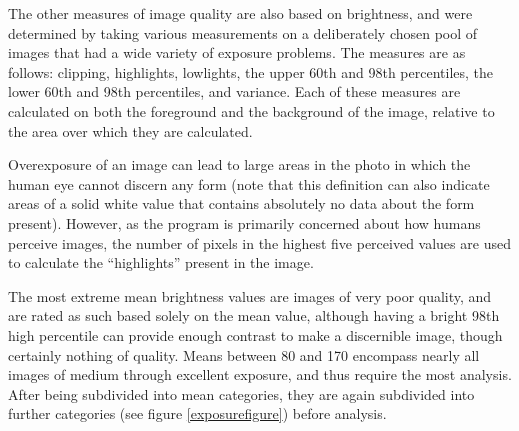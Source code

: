 \documentclass{article}
\begin{document}
The other measures of image quality are also based on brightness, and were determined by taking various measurements on a deliberately chosen pool of images that had a wide variety of exposure problems. The measures are as follows: clipping, highlights, lowlights, the upper 60th and 98th percentiles, the lower 60th and 98th percentiles, and variance. Each of these measures are calculated on both the foreground and the background of the image, relative to the area over which they are calculated.

Overexposure of an image can lead to large areas in the photo in which the human eye cannot discern any form (note that this definition can also indicate areas of a solid white value that contains absolutely no data about the form present). However, as the program is primarily concerned about how humans perceive images, the number of pixels in the highest five perceived values are used to calculate the “highlights” present in the image.




The most extreme mean brightness values are images of very poor quality, and are rated as such based solely on the mean value, although having a bright 98th high percentile can provide enough contrast to make a discernible image, though certainly nothing of quality. Means between 80 and 170 encompass nearly all images of medium through excellent exposure, and thus require the most analysis. After being subdivided into mean categories, they are again subdivided into further categories (see figure \ref{exposurefigure}) before analysis.
\end{document}
